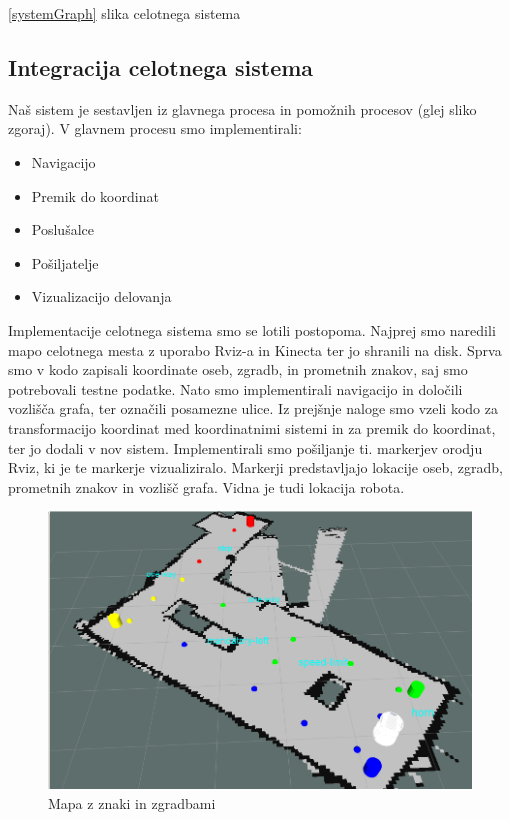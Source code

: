 \documentclass[a4paper,11pt]{article}
\begin{document}
 \ref{systemGraph}{  slika celotnega sistema}

\subsection{Integracija celotnega sistema}

Naš sistem je sestavljen iz glavnega procesa in pomožnih procesov (glej sliko zgoraj). V glavnem procesu smo implementirali:
\begin{itemize}
\item Navigacijo
\item Premik do koordinat
\item Poslušalce
\item Pošiljatelje
\item Vizualizacijo delovanja
\end{itemize}

Implementacije celotnega sistema smo se lotili postopoma. Najprej smo naredili mapo celotnega mesta z uporabo Rviz-a in Kinecta ter jo shranili na disk. Sprva smo v kodo zapisali koordinate oseb, zgradb, in prometnih znakov, saj smo potrebovali testne podatke. Nato smo implementirali navigacijo in določili vozlišča grafa, ter označili posamezne ulice. Iz prejšnje naloge smo vzeli kodo za transformacijo koordinat med koordinatnimi sistemi in za premik do koordinat, ter jo dodali v nov sistem. Implementirali smo pošiljanje ti. markerjev orodju Rviz, ki je te markerje vizualiziralo. Markerji predstavljajo lokacije oseb, zgradb, prometnih znakov in vozlišč grafa. Vidna je tudi lokacija robota.

\begin{figure}[h]
\begin{center}
\includegraphics[width=\textwidth]{mapAll.png}
\caption{Mapa z znaki in zgradbami}
\label{slika1}
\end{center}
\end{figure}
\end{document}
